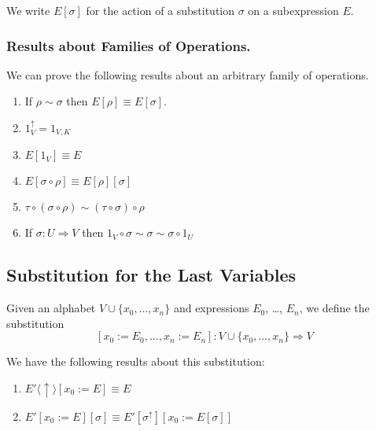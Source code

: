 \documentclass[envcountsame]{llncs}
\begin{document}

We write $E [ \sigma ]$ for the action of a substitution $\sigma$ on a subexpression $E$.

\subsubsection{Results about Families of Operations.}

We can prove the following results about an arbitrary family of operations.

\begin{lemma}
 \begin{enumerate}
  \item If $\rho \sim \sigma$ then $E [ \rho ] \equiv E [ \sigma ]$.
  \item  $1_V^\uparrow = 1_{V, K}$
  \item $E [ 1_V ] \equiv E$
  \item $E [ \sigma \circ \rho ] \equiv E [ \rho ] [ \sigma ]$
  \item $\tau \circ (\sigma \circ \rho) \sim (\tau \circ \sigma) \circ \rho$
  \item If $\sigma : U \Rightarrow V$ then $1_V \circ \sigma \sim \sigma \sim \sigma \circ 1_U$
 \end{enumerate}
\end{lemma}

\subsection{Substitution for the Last Variables}

Given an alphabet $V \cup \{ x_0, \ldots, x_n\}$ and expressions $E_0$, \ldots, $E_n$, we define the substitution
\[ [x_0 := E_0, \ldots, x_n := E_n] : V \cup \{ x_0, \ldots, x_n \} \Rightarrow V \]


We have the following results about this substitution:
\begin{lemma}
 \begin{enumerate}
  \item $E' \langle \uparrow \rangle [ x_0 := E ] \equiv E$
  \item $E' [ x_0 := E ] [ \sigma ] \equiv E' [ \sigma^\uparrow ] [ x_0:= E [ \sigma ] ]$
 \end{enumerate}
\end{lemma}
\end{document}
